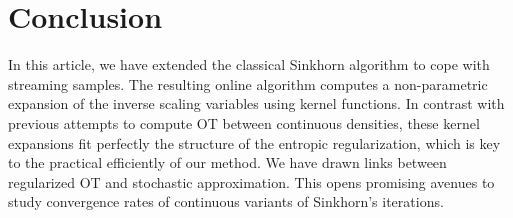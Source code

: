
\section{Conclusion}

In this article, we have extended the classical Sinkhorn algorithm to cope with streaming samples. The resulting online algorithm computes a non-parametric expansion of the inverse scaling variables using kernel functions. In contrast with previous attempts to compute OT between continuous densities, these kernel expansions fit perfectly the structure of the entropic regularization, which is key to the practical efficiently of our method. 
%
We have drawn links between regularized OT and stochastic approximation. This opens promising avenues to study convergence rates of continuous variants of Sinkhorn's iterations.